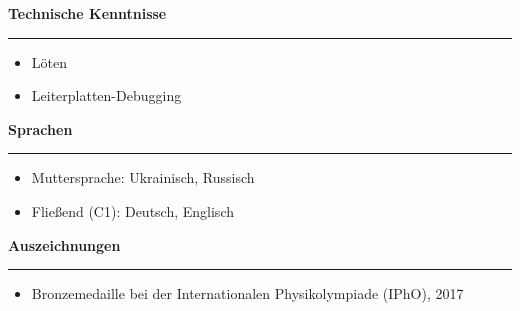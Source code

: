 \documentclass[12pt]{article} %
\newcommand{\HighlightedText}[1] {{\textbf{#1}}}
\newenvironment{ItemizeSection}[1]{
    \vspace{1mm}
    \HighlightedText{#1}
    \vspace{0.5mm}
    {\color{custom_blue} \hrule}
    \begin{itemize}[left=0.5em, topsep=0pt, itemsep=0pt, label={$\bullet$}]
}{
    \end{itemize}
}
\begin{document}

\begin{ItemizeSection}{Technische Kenntnisse}
    \item Löten
    \item Leiterplatten-Debugging
\end{ItemizeSection}

\begin{ItemizeSection}{Sprachen}
    \item Muttersprache: Ukrainisch, Russisch
    \item Fließend (C1): Deutsch, Englisch
\end{ItemizeSection}

\begin{ItemizeSection}{Auszeichnungen}
    \item Bronzemedaille bei der Internationalen Physikolympiade (IPhO), 2017
\end{ItemizeSection}
\end{document}
